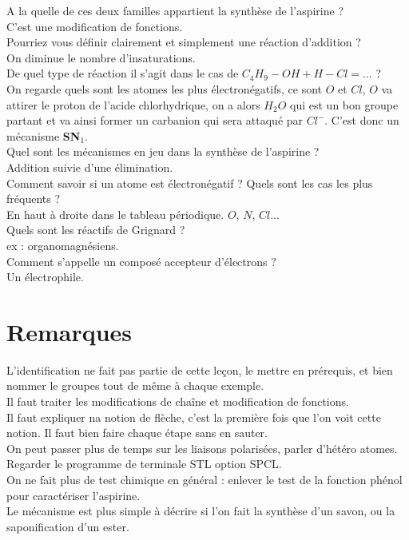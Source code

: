 \documentclass[12pt,prb,aps,epsf]{article}
\begin{document}
A la quelle de ces deux familles appartient la synthèse de l'aspirine ?\\
C'est une modification de fonctions.\\

Pourriez vous définir clairement et simplement une réaction d'addition ?\\
On diminue le nombre d'insaturations.\\

De quel type de réaction il s'agit dans le cas de $C_4H_9-OH + H-Cl =...$ ?\\
On regarde quels sont les atomes les plus électronégatifs, ce sont $O$ et $Cl$, $O$ va attirer le proton de l'acide chlorhydrique, on a alors $H_2O$ qui est un bon groupe partant et va ainsi former un carbanion qui sera attaqué par $Cl^-$. C'est donc un mécanisme \textbf{SN$_1$}.\\

Quel sont les mécanismes en jeu dans la synthèse de l'aspirine ?\\
Addition suivie d'une élimination.\\

Comment savoir si un atome est électronégatif ? Quels sont les cas les plus fréquents ?\\
En haut à droite dans le tableau périodique. $O$, $N$, $Cl$...\\

Quels sont les réactifs de Grignard ?\\
ex : organomagnésiens.\\

Comment s'appelle un composé accepteur d'électrons ?\\
Un électrophile.

\section{Remarques}
L'identification ne fait pas partie de cette leçon, le mettre en prérequis, et bien nommer le groupes tout de même à chaque exemple.\\
Il faut traiter les modifications de chaîne et modification de fonctions.\\
Il faut expliquer na notion de flèche, c'est la première fois que l'on voit cette notion. Il faut bien faire chaque étape sans en sauter.\\
On peut passer plus de temps sur les liaisons polarisées, parler d'hétéro atomes.\\
Regarder le programme de terminale STL option SPCL.\\
On ne fait plus de test chimique en général : enlever le test de la fonction phénol pour caractériser l'aspirine.\\
Le mécanisme est plus simple à décrire si l'on fait la synthèse d'un savon, ou la saponification d'un ester.\\
\end{document}
